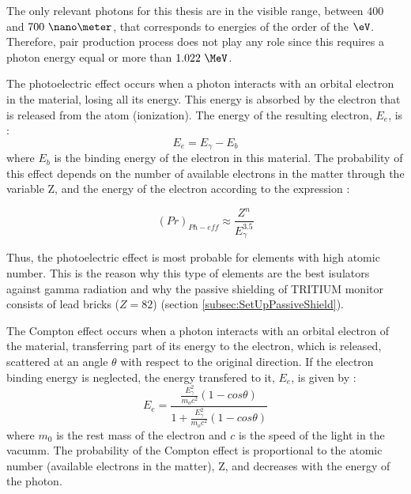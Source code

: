 The only relevant photons for this thesis are in the visible range, between $400$ and $700~\nano\meter$, that corresponds to energies of the order of the $\eV$. Therefore, pair production process does not play any role since this requires a photon energy equal or more than $1.022~\MeV$.

The photoelectric effect occurs when a photon interacts with an orbital electron in the material, losing all its energy. This energy is absorbed by the electron that is released from the atom (ionization). The energy of the resulting electron, $E_e$, is \cite{Knoll, Leo}:
\begin{equation}
E_e = E_\gamma - E_b 
\label{eq:PhotoelectricEffect}
\end{equation}
where $E_b$ is the binding energy of the electron in this material. The probability of this effect depends on the number of available electrons in the matter through the variable Z, and the energy of the electron according to the expression \cite{Knoll}:

\begin{equation}
\left(Pr\right)_{Ph-eff} \approx \frac{Z^n}{E_\gamma^{3.5}}
\label{eq:PhotoelectricProb}
\end{equation}

Thus, the photoelectric effect is most probable for elements with high atomic number. This is the reason why this type of elements are the best isulators against gamma radiation and why the passive shielding of TRITIUM monitor consists of lead bricks ($Z=82$) (section \ref{subsec:SetUpPassiveShield}). %

The Compton effect occurs when a photon interacts with an orbital electron of the material, transferring part of its energy to the electron, which is released, scattered at an angle $\theta$ with respect to the original direction. If the electron binding energy is neglected, the energy transfered to it, $E_e$, is given by \cite{Knoll, Leo}:
\begin{equation}
E_e=\frac{\frac{E_\gamma^2}{m_oc^2}\left(1-cos\theta\right)}{1+ \frac{E_\gamma^2}{m_oc^2}\left(1-cos\theta\right)}
\label{eq:ComptonEffect}
\end{equation}
where $m_0$ is the rest mass of the electron and $c$ is the speed of the light in the vacumm. The probability of the Compton effect is proportional to the atomic number (available electrons in the matter), Z,  and decreases with the energy of the photon. 

